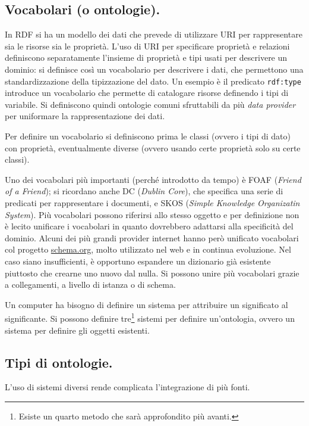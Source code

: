 \documentclass[11pt]{article}
\begin{document}
\begin{multicols}{2}
\section{Vocabolari (o ontologie).}
In RDF si ha un modello dei dati che prevede di utilizzare URI per rappresentare sia le risorse sia le proprietà.
L'uso di URI per specificare proprietà e relazioni definiscono separatamente l'insieme di proprietà e tipi usati per descrivere un dominio: si definisce così un vocabolario per descrivere i dati, che permettono una standardizzazione della tipizzazione del dato.
Un esempio è il predicato \verb|rdf:type| introduce un vocabolario che permette di catalogare risorse definendo i tipi di variabile.
Si definiscono quindi ontologie comuni sfruttabili da più \textit{data provider} per uniformare la rappresentazione dei dati.

Per definire un vocabolario si definiscono prima le classi (ovvero i tipi di dato) con proprietà, eventualmente diverse (ovvero usando certe proprietà solo su certe classi).

Uno dei vocabolari più importanti (perché introdotto da tempo) è FOAF (\textit{Friend of a Friend}); si ricordano anche DC (\textit{Dublin Core}), che specifica una serie di predicati per rappresentare i documenti, e SKOS (\textit{Simple Knowledge Organizatin System}).
Più vocabolari possono riferirsi allo stesso oggetto e per definizione non è lecito unificare i vocabolari in quanto dovrebbero adattarsi alla specificità del dominio.
Alcuni dei più grandi provider internet hanno però unificato vocabolari col progetto \url{schema.org}, molto utilizzato nel web e in continua evoluzione.
Nel caso siano insufficienti, è opportuno espandere un dizionario già esistente piuttosto che crearne uno nuovo dal nulla.
Si possono unire più vocabolari grazie a collegamenti, a livello di istanza o di schema.

Un computer ha bisogno di definire un sistema per attribuire un significato al significante.
Si possono definire tre\footnote{Esiste un quarto metodo che sarà approfondito più avanti.} sistemi per definire un'ontologia, ovvero un sistema per definire gli oggetti esistenti.

\subsection{Tipi di ontologie.}
L'uso di sistemi diversi rende complicata l'integrazione di più fonti.


\end{multicols}
\end{document}
